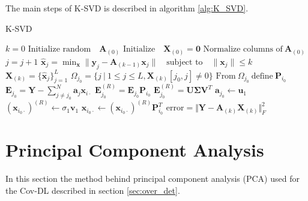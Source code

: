 The main steps of K-SVD is described in algorithm \ref{alg:K_SVD}. 
\begin{algorithm}[H]
\caption{K-SVD}
\begin{algorithmic}[1]
			\State$k = 0$			
			\State$\text{Initialize random} \quad  \textbf{A}_{(0)}$            
			\State$\text{Initialize} \quad \textbf{X}_{(0)}=\mathbf{0}$
			\State
            \State$\text{Normalize columns of} \ \textbf{A}_{(0)}$
                \State $j = j+1$
                 
                	\State$\hat{\textbf{x}}_{j} = \min_{\textbf{x}} \|\textbf{y}_j -\textbf{A}_{(k-1)}\textbf{x}_{j}\| \quad \text{subject to} \quad \|\textbf{x}_{j}\| \leq k $ 
				\EndFor
				\State$\textbf{X}_{(k)} = \lbrace \hat{\textbf{x}}_{j} \rbrace_{j=1}^{L}$
					\State$\Omega_{j_0} = \lbrace j \ \vert \ 1 \leq j \leq L, \textbf{X}_{(k)} [j_0, j]\neq 0\rbrace$
					\State$\text{From} \ \Omega_{j_0} \ \text{define} \ \textbf{P}_{i_0} $
					\State$\textbf{E}_{j_0} =  \textbf{Y} - \sum_{j \neq j_{0}}^{N} \textbf{a}_j \textbf{x}_{i \cdot}$
					\State$\textbf{E}_{j_0}^{(R)} =  \textbf{E}_{j_0} \textbf{P}_{i_0}$
					\State$\textbf{E}_{j_0}^{(R)} =\textbf{U} \boldsymbol{\Sigma} \textbf{V}^T$ 
					\State$\textbf{a}_{j_0} \gets \textbf{u}_{1}$ 
					\State$\left( \textbf{x}_{i_0 \cdot} \right)^{(R)} \gets \sigma_{1} \textbf{v}_{1}$
					\State$\textbf{x}_{i_0 \cdot} \gets \left( \textbf{x}_{i_0 \cdot} \right)^{(R)} \textbf{P}_{i_0}^T $ 
				\EndFor
				\State$\text{error} = \Vert \textbf{Y} - \textbf{A}_{(k)} \textbf{X}_{(k)} \Vert_{F}^2 $
          		\EndWhile
            \EndProcedure
        \end{algorithmic} 
        \label{alg:K_SVD}
\end{algorithm}

\section{Principal Component Analysis}\label{app_sec:PCA}
In this section the method behind principal component analysis (PCA) used for the Cov-DL described in section \ref{sec:over_det}.


